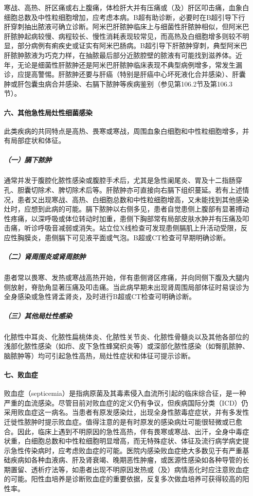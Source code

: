 寒战、高热、肝区痛或右上腹痛，体检肝大并有压痛或（及）肝区叩击痛，血象白细胞总数及中性粒细胞增加，应考虑本病。B超有助诊断，必要时在B超引导下行肝穿刺抽出脓液可确立诊断。阿米巴肝脓肿临床上与细菌性肝脓肿相似，但阿米巴肝脓肿起病较慢、病程较长、慢性消耗表现较常见，而高热及白细胞增多则较不明显，部分病例有痢疾史或证实有阿米巴肠病。B超引导下肝脓肿穿刺，典型阿米巴肝脓肿脓液为巧克力样，在抽脓最后部分近脓腔壁的脓液有可能找到滋养体。近年，无论是细菌性肝脓肿还是阿米巴肝脓肿临床表现不典型病例增多，常发生漏诊，应提高警惕。肝脓肿还要与肝癌（特别是肝癌中心坏死液化合并感染）、肝囊肿或肝包囊虫病合并感染、右膈下脓肿等疾病鉴别（参见第106.2节及第106.3节）。

\paragraph{六、其他急性局灶性细菌感染}

此类疾病的共同特点是高热、畏寒或寒战，周围血象白细胞和中性粒细胞增多，并有局部症状和体征。

\subparagraph{（一）膈下脓肿}

通常并发于腹腔化脓性感染或腹腔手术后，尤其是急性阑尾炎、胃及十二指肠穿孔、胆囊切除术、脾切除术后等。肝脓肿亦可直接向右膈下组织蔓延。若有上述情况，患者又出现寒战、高热、白细胞总数和中性粒细胞增高，又未能找到其他感染灶时，应想到此病的可能。膈下脓肿以右侧多见，患者自觉患侧上腹部有显著搏动性疼痛，以深呼吸或体位转动时加重，患侧下胸部常有局部皮肤水肿并有压痛及叩击痛，听诊呼吸音减弱或消失。站立位X线检查可发现患侧膈肌上升活动受限，反应性胸膜炎，患侧膈下可见液平面或气泡。B超或CT检查可早期明确诊断。

\subparagraph{（二）肾周围炎或肾周脓肿}

患者常以畏寒、发热或寒战高热开始，伴有患侧肾区疼痛，并向同侧下腹及大腿内侧放射，脊肋角显著压痛及叩击痛。当此病早期未出现肾周围局部体征时易误诊为全身感染或急性肾盂肾炎，及时进行B超或CT检查可明确诊断。

\subparagraph{（三）其他局灶性感染}

化脓性中耳炎、化脓性扁桃体炎、化脓性关节炎、化脓性骨髓炎以及其他各部位的浅部化脓性感染（如疖、皮下急性蜂窝织炎等）或深部化脓性感染（如臀肌脓肿、脑脓肿等）均可引起急性高热，局灶性症状和体征可提示诊断。

\paragraph{七、败血症}

败血症（septicemia）是指病原菌及其毒素侵入血流所引起的临床综合征，是一种严重的血流感染。尽管目前对败血症的定义仍有争议，但疾病国际分类（ICD）仍采用败血症这一病名。当患者有原发感染灶，出现全身性脓毒症症状，并有多发性迁徙性脓肿时提示败血症。值得注意的是有时原发的感染病灶可能很轻微或已愈合。因此，临床上遇到不明原因的急性高热，伴有畏寒或寒战、出汗，全身中毒症状重，白细胞总数和中性粒细胞明显增高，而无特殊症状、体征及流行病学病史提示急性传染病时，应考虑败血症的可能。医院内感染败血症绝大多数见于有严重基础疾病如各种血液病、肝及肾衰竭、晚期恶性肿瘤，或医源性感染如各种导管的长期置留、透析疗法等，如患者出现不明原因发热或（及）病情恶化时应注意败血症的可能。阳性血培养是诊断败血症的重要依据，反复多次做血培养可获得较高的阳性率。

